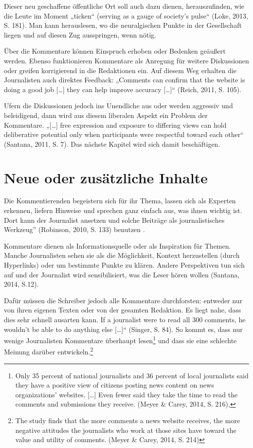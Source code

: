 Dieser neu geschaffene öffentliche Ort soll auch dazu dienen, herauszufinden,
wie die Leute im Moment „ticken“ (\glqq serving as a gauge of society’s pulse“
(Loke, 2013, S. 181). Man kann herauslesen, wo die neuralgischen Punkte in der
Gesellschaft liegen und auf diesen Zug ausspringen, wenn nötig.


Über die Kommentare können Einspruch erhoben oder Bedenken geäußert werden.
Ebenso funktionieren Kommentare als Anregung für weitere Diskussionen oder
greifen korrigierend  in die Redaktionen ein. Auf diesem Weg erhalten die
Journalisten auch direktes Feedback: „Comments can confirm that the website is
doing a good job [\ldots] they can help improve accuracy [\ldots]“ (Reich, 2011,
S. 105).

Ufern die Diskussionen jedoch ins Unendliche aus oder werden aggressiv und
beleidigend, dann wird aus diesem liberalen Aspekt ein Problem der Kommentare.
„[\ldots] free expression and exposure to differing views can hold deliberative
potential only when participants were respectful toward each other“ (Santana,
2011, S. 7). Das nächste Kapitel wird sich damit beschäftigen.


\section{Neue oder zusätzliche Inhalte}

Die Kommentierenden begeistern sich für ihr Thema, lassen sich als Experten
erkennen, liefern Hinweise und sprechen ganz einfach aus, was ihnen wichtig ist.
Dort kann der Journalist ansetzen und solche Beiträge als \glqq journalistisches
Werkzeug'' (Robinson, 2010, S. 133) benutzen .

Kommentare dienen als Informationsquelle oder als Inspiration für Themen.
Manche Journalisten sehen sie als die Möglichkeit, Kontext herzustellen (durch
Hyperlinks) oder um bestimmte Punkte zu klären.  Andere Perspektiven tun sich
auf und der Journalist wird sensibilisiert, was die Leser hören wollen (Santana,
2014, S.12).

Dafür müssen die Schreiber jedoch alle Kommentare durchforsten: entweder nur von
ihren eigenen Texten oder von der gesamten Redaktion. Es liegt nahe, dass dies
sehr schnell ausarten kann. \glqq If a journalist were to read all 300 comments,
he wouldn’t be able to do anything else [\ldots]“ (Singer, S. 84).  So kommt es,
dass nur wenige Journalisten Kommentare überhaupt lesen\footnote{Only 35 percent
of national journalists and 36 percent of local journalists said they have a
positive view of citizens posting news content on news organizations’ websites.
[\ldots] Even fewer said they take the time to read the comments and submissions
they receive. (Meyer \& Carey, 2014, S. 216)‚} und dass sie eine schlechte
Meinung darüber entwickeln.\footnote{The study finds that the more comments a
news website receives, the more negative attitudes the journalists who
work at those sites have toward the value and utility of comments.
(Meyer \& Carey, 2014, S. 214)}


